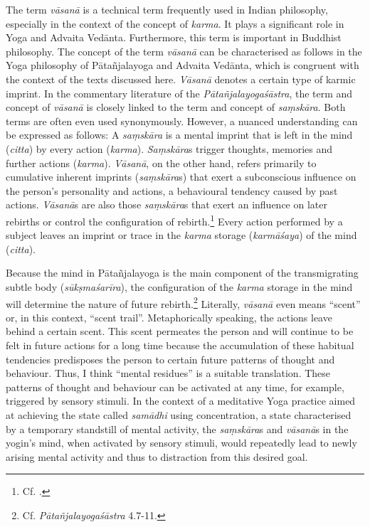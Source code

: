 The term \textit{vāsanā} is a technical term frequently used in Indian philosophy, especially in the context of the concept of \textit{karma}. It plays a significant role in Yoga and Advaita Vedānta. Furthermore, this term is important in Buddhist philosophy. The concept of the term \textit{vāsanā} can be characterised as follows in the Yoga philosophy of Pātañjalayoga and Advaita Vedānta, which is congruent with the context of the texts discussed here. \textit{Vāsanā} denotes a certain type of karmic imprint. In the commentary literature of the \textit{Pātañjalayogaśāstra}, the term and concept of \textit{vāsanā} is closely linked to the term and concept of \textit{saṃskāra}. Both terms are often even used synonymously. However, a nuanced understanding can be expressed as follows: A \textit{saṃskāra} is a mental imprint that is left in the mind (\textit{citta}) by every action (\textit{karma}). \textit{Saṃskāra}s trigger thoughts, memories and further actions (\textit{karma}). \textit{Vāsanā}, on the other hand, refers primarily to cumulative inherent imprints (\textit{saṃskāra}s) that exert a subconscious influence on the person's personality and actions, a behavioural tendency caused by past actions. \textit{Vāsanā}s are also those \textit{saṃskāra}s that exert an influence on later rebirths or control the configuration of rebirth.\footnote{Cf. \citeauthor[2009: 418]{bryant2009}.} Every action performed by a subject leaves an imprint or trace in the \textit{karma} storage (\textit{karmāśaya}) of the mind (\textit{citta}).

Because the mind in Pātañjalayoga is the main component of the transmigrating subtle body (\textit{sūkṣmaśarīra}), the configuration of the \textit{karma} storage in the mind will determine the nature of future rebirth.\footnote{Cf. \textit{Pātañjalayogaśāstra} 4.7-11.} Literally, \textit{vāsanā} even means ``scent'' or, in this context, ``scent trail''. Metaphorically speaking, the actions leave behind a certain scent. This scent permeates the person and will continue to be felt in future actions for a long time because the accumulation of these habitual tendencies predisposes the person to certain future patterns of thought and behaviour. Thus, I think ``mental residues'' is a suitable translation. These patterns of thought and behaviour can be activated at any time, for example, triggered by sensory stimuli. In the context of a meditative Yoga practice aimed at achieving the state called \textit{samādhi} using concentration, a state characterised by a temporary standstill of mental activity, the \textit{saṃskāra}s and \textit{vāsanā}s in the yogin's mind, when activated by sensory stimuli, would repeatedly lead to newly arising mental activity and thus to distraction from this desired goal.


